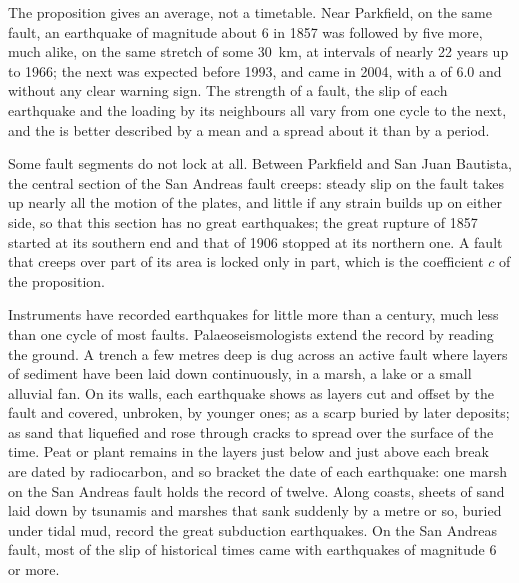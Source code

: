 The proposition gives an average, not a timetable. Near Parkfield, on the
same fault, an earthquake of magnitude about 6 in 1857 was followed by five
more, much alike, on the same stretch of some \qty{30}{km}, at intervals of
nearly 22 years up to 1966; the next was expected before 1993, and came in
2004, with a  of 6.0 and without any clear warning sign. The
strength of a fault, the slip of each earthquake and the loading by its
neighbours all vary from one cycle to the next, and the  is
better described by a mean  and a spread about it than by
a period.

Some fault segments do not lock at all. Between Parkfield and San Juan
Bautista, the central section of the San Andreas fault creeps: steady slip on
the fault takes up nearly all the motion of the plates, and little if any
strain builds up on either side, so that this section has no great
earthquakes; the great rupture of 1857 started at its southern end and that of
1906 stopped at its northern one. A fault that creeps over part of its area is
locked only in part, which is the coefficient $c$ of the proposition.

\begin{inthefield}
Instruments have recorded earthquakes for little more than a century, much
less than one cycle of most faults. Palaeoseismologists extend the record by
reading the ground. A trench a few metres deep is dug across an active fault
where layers of sediment have been laid down continuously, in a marsh, a lake
or a small alluvial fan. On its walls, each earthquake shows as layers cut and
offset by the fault and covered, unbroken, by younger ones; as a scarp buried
by later deposits; as sand that liquefied and rose through cracks to spread
over the surface of the time. Peat or plant remains in the layers just below
and just above each break are dated by radiocarbon, and so bracket the date of
each earthquake: one marsh on the San Andreas fault holds the record of twelve.
Along coasts, sheets of sand laid down by tsunamis and marshes that sank
suddenly by a metre or so, buried under tidal mud, record the great subduction
earthquakes. On the San Andreas fault, most of the slip of historical times
came with earthquakes of magnitude 6 or more.
\end{inthefield}

